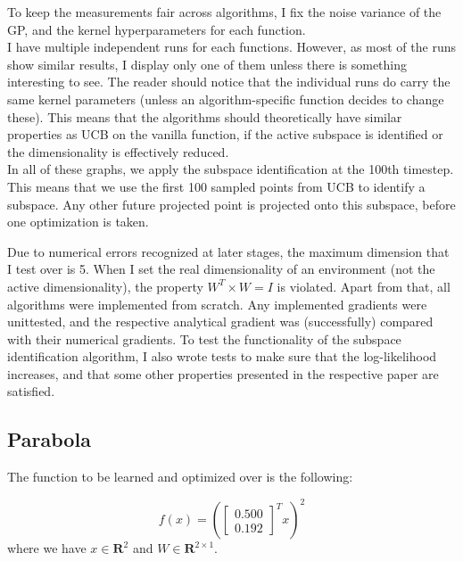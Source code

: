 To keep the measurements fair across algorithms, I fix the noise variance of the GP, and the kernel hyperparameters for each function. \\

I have multiple independent runs for each functions.
However, as most of the runs show similar results, I display only one of them unless there is something interesting to see.
The reader should notice that the individual runs do carry the same kernel parameters (unless an algorithm-specific function decides to change these).
This means that the algorithms should theoretically have similar properties as UCB on the vanilla function, if the active subspace is identified or the dimensionality is effectively reduced. \\

In all of these graphs, we apply the subspace identification at the 100th timestep.
This means that we use the first 100 sampled points from UCB to identify a subspace.
Any other future projected point is projected onto this subspace, before one optimization is taken.

Due to numerical errors recognized at later stages, the maximum dimension that I test over is 5.
When I set the real dimensionality of an environment (not the active dimensionality), the property $W^T \times W = I$ is violated.
Apart from that, all algorithms were implemented from scratch.
Any implemented gradients were unittested, and the respective analytical gradient was (successfully) compared with their numerical gradients.
To test the functionality of the subspace identification algorithm, I also wrote tests to make sure that the log-likelihood increases, and that some other properties presented in the respective paper are satisfied.

\subsection{Parabola}

The function to be learned and optimized over is the following:

\def\WParaboa2D{
\begin{bmatrix}
    0.500\\
    0.192
\end{bmatrix}}

\begin{equation}
f(x) = \left( \WParaboa2D^T x \right)^2
\end{equation}
where we have $x \in \mathbf{R}^2$ and $W \in \mathbf{R}^{2 \times 1}$.


